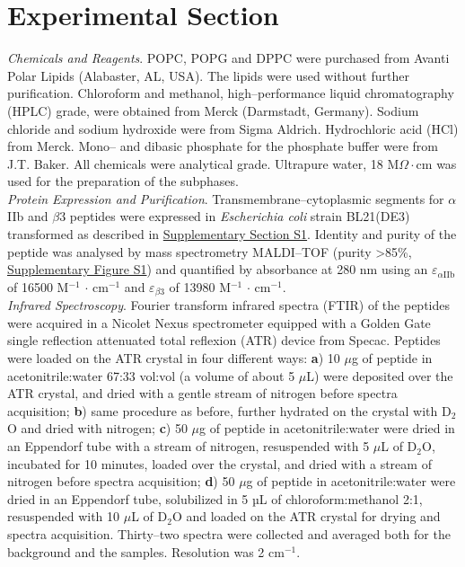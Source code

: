 \documentclass[journal=jacsat,manuscript=article]{achemso}
\begin{document}
\section{Experimental Section}\label{sec:expeSection}

\textit{Chemicals and Reagents}. POPC, POPG and DPPC were purchased from Avanti Polar Lipids (Alabaster, AL, USA). The lipids were used without further purification. Chloroform and methanol, high–performance liquid chromatography (HPLC) grade, were obtained from Merck (Darmstadt, Germany). Sodium chloride and sodium hydroxide were from Sigma Aldrich. Hydrochloric acid (HCl) from Merck. Mono– and dibasic phosphate for the phosphate buffer were from J.T. Baker. All chemicals were analytical grade. Ultrapure water, 18 M$\Omega \cdot$cm was used for the preparation of the subphases.\\

\noindent \textit{Protein Expression and Purification}. Transmembrane–cytoplasmic segments for $\alpha$IIb and $\beta$3 peptides were expressed in \textit{Escherichia coli} strain BL21(DE3) transformed as described in \hyperref[sec:support]{Supplementary Section S1}. Identity and purity of the peptide was analysed by mass spectrometry MALDI–TOF (purity >85\%, \hyperref[sec:support]{Supplementary Figure S1}) and quantified by absorbance at 280 nm using an {\Large{$\varepsilon$}}$_{\alpha \text{IIb}}$ of 16500 M$^{-1}$ $\cdot$ cm$^{-1}$ and {\Large{$\varepsilon$}}$_{\beta \text{3}}$ of 13980 M$^{-1}$ $\cdot$ cm$^{-1}$.\\

\noindent \textit{Infrared Spectroscopy}. Fourier transform infrared spectra (FTIR) of the peptides were acquired in a Nicolet Nexus spectrometer equipped with a Golden Gate single reflection attenuated total reflexion (ATR) device from Specac. Peptides were loaded on the ATR crystal in four different ways: \textbf{a}) 10 $\mu$g of peptide in acetonitrile:water 67:33 vol:vol (a volume of about 5 $\mu$L) were deposited over the ATR crystal, and dried with a gentle stream of nitrogen before spectra acquisition; \textbf{b}) same procedure as before, further hydrated on the crystal with D$_2$O and dried with nitrogen; \textbf{c}) 50 $\mu$g of peptide in acetonitrile:water were dried in an Eppendorf tube with a stream of nitrogen, resuspended with 5 $\mu$L of D$_2$O, incubated for 10 minutes, loaded over the crystal, and dried with a stream of nitrogen before spectra acquisition; \textbf{d}) 50 $\mu$g of peptide in acetonitrile:water were dried in an Eppendorf tube, solubilized in 5 µL of chloroform:methanol 2:1, resuspended with 10 $\mu$L of D$_2$O and loaded on the ATR crystal for drying and spectra acquisition. Thirty–two spectra were collected and averaged both for the background and the samples. Resolution was 2 cm$^{-1}$.\\
\end{document}
